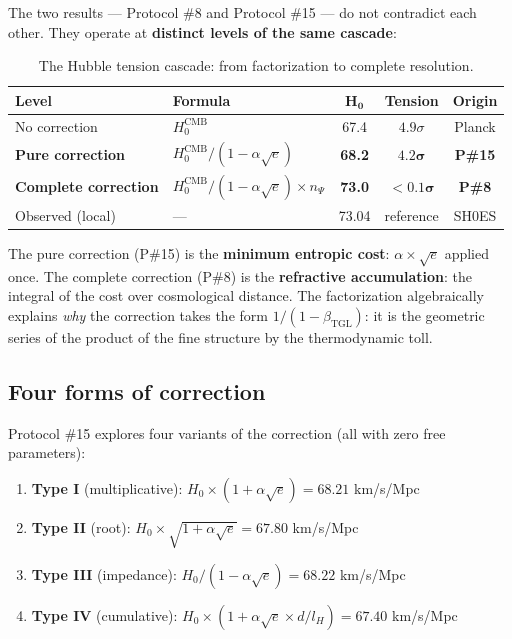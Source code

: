 \documentclass[12pt,a4paper,twoside]{article}
\newcommand{\betatgl}{\beta_{\!\scriptscriptstyle\mathrm{TGL}}}
\begin{document}
The two results --- Protocol \#8 and Protocol \#15 --- do not contradict each other. They operate at \textbf{distinct levels of the same cascade}:

\begin{table}[H]
\centering
\caption{The Hubble tension cascade: from factorization to complete resolution.}
\label{tab:cascata}
\begin{tabular}{llccc}
\toprule
\textbf{Level} & \textbf{Formula} & $\boldsymbol{H_0}$ & \textbf{Tension} & \textbf{Origin} \\
\midrule
No correction & $H_0^{\text{CMB}}$ & 67.4 & $4.9\sigma$ & Planck \\
\textbf{Pure correction} & $H_0^{\text{CMB}}/(1 - \alpha\sqrt{e})$ & \textbf{68.2} & $\boldsymbol{4.2\sigma}$ & \textbf{P\#15} \\
\textbf{Complete correction} & $H_0^{\text{CMB}}/(1 - \alpha\sqrt{e}) \times n_\Psi$ & \textbf{73.0} & $\boldsymbol{< 0.1\sigma}$ & \textbf{P\#8} \\
\midrule
Observed (local) & --- & 73.04 & reference & SH0ES \\
\bottomrule
\end{tabular}
\end{table}

\noindent The pure correction (P\#15) is the \textbf{minimum entropic cost}: $\alpha \times \sqrt{e}$ applied once. The complete correction (P\#8) is the \textbf{refractive accumulation}: the integral of the cost over cosmological distance. The factorization algebraically explains \textit{why} the correction takes the form $1/(1 - \betatgl)$: it is the geometric series of the product of the fine structure by the thermodynamic toll.


\subsection{Four forms of correction}

Protocol \#15 explores four variants of the correction (all with zero free parameters):

\begin{enumerate}[nosep]
\item \textbf{Type I} (multiplicative): $H_0 \times (1 + \alpha\sqrt{e}) = 68.21$ km/s/Mpc
\item \textbf{Type II} (root): $H_0 \times \sqrt{1 + \alpha\sqrt{e}} = 67.80$ km/s/Mpc
\item \textbf{Type III} (impedance): $H_0 / (1 - \alpha\sqrt{e}) = 68.22$ km/s/Mpc
\item \textbf{Type IV} (cumulative): $H_0 \times (1 + \alpha\sqrt{e} \times d/l_H) = 67.40$ km/s/Mpc
\end{enumerate}
\end{document}
